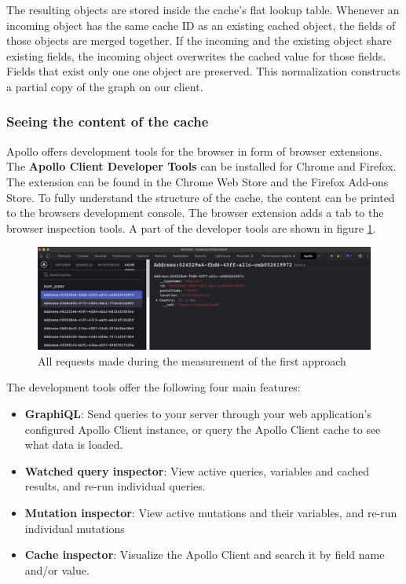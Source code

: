 The resulting objects are stored inside the cache's flat lookup table. Whenever an incoming object has the same cache ID as an existing cached object, the fields of those objects are merged together. If the incoming and the existing object share existing fields, the incoming object overwrites the cached value for those fields. Fields that exist only one one object are preserved. This normalization constructs a partial copy of the graph on our client. \cite{misc:-:apollo-client-cache-overview}

\subsubsection{Seeing the content of the cache}

Apollo offers development tools for the browser in form of browser extensions. The \textbf{Apollo Client Developer Tools} can be installed for Chrome and Firefox. The extension can be found in the Chrome Web Store and the Firefox Add-ons Store. \cite{misc:-:apollo-developer-tools} To fully understand the structure of the cache, the content can be printed to the browsers development console. The browser extension adds a tab to the browser inspection tools. A part of the developer tools are shown in figure \ref{fig:background:apollo:apollo-dev-tools}.

\ifshowImages
  \begin{figure}[H]
  \centering
  \includegraphics[width=1\linewidth]{images/background/apollo/apollo-dev-tools.jpeg}
  \caption{All requests made during the measurement of the first approach}\label{fig:background:apollo:apollo-dev-tools}
  \end{figure}
\fi

The development tools offer the following four main features:

\begin{itemize}
  \item \textbf{GraphiQL}: Send queries to your server through your web application's configured Apollo Client instance, or query the Apollo Client cache to see what data is loaded.
  \item \textbf{Watched query inspector}: View active queries, variables and cached results, and re-run individual queries.
  \item \textbf{Mutation inspector}: View active mutations and their variables, and re-run individual mutations
  \item \textbf{Cache inspector}: Visualize the Apollo Client and search it by field name and/or value.
\end{itemize}

